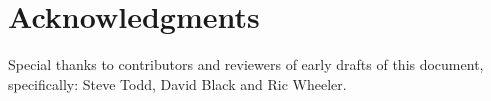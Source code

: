 \section{Acknowledgments}

Special thanks to contributors and reviewers of early drafts of this
document, specifically: Steve Todd, David Black and Ric Wheeler.
